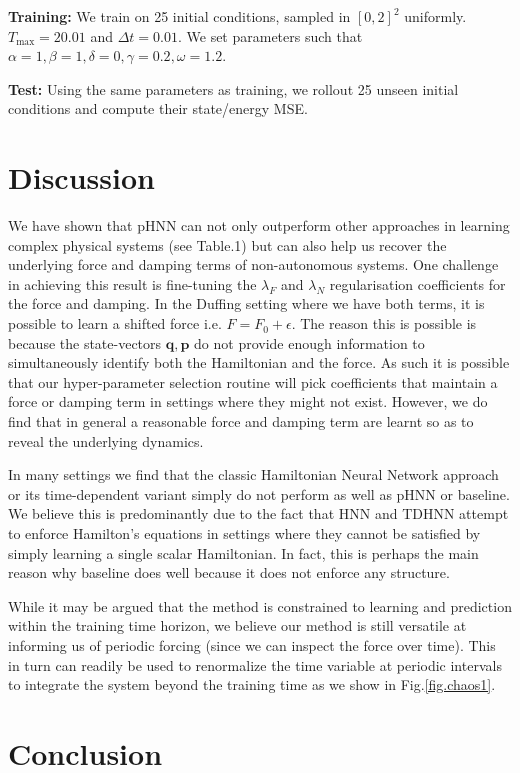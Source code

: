 \documentclass{article}
\begin{document}
\textbf{Training:} We train on 25 initial conditions, sampled in $[0,2]^2$ uniformly. $T_{\max} = 20.01$ and $\Delta t = 0.01$. We set parameters such that $\alpha =1, \beta =1,\delta =0,\gamma = 0.2,\omega = 1.2$.

\textbf{Test:} Using the same parameters as training, we rollout 25 unseen initial conditions and compute their state/energy MSE.

\section{Discussion}

We have shown that pHNN can not only outperform other approaches in learning complex physical systems (see Table.1) but can also help us recover the underlying force and damping terms of non-autonomous systems. One challenge in achieving this result is fine-tuning the $\lambda_F$ and $\lambda_N$ regularisation coefficients for the force and damping. In the Duffing setting where we have both terms, it is possible to learn a shifted force i.e. $F = F_0 + \epsilon$. The reason this is possible is because the state-vectors $\mathbf{q},\mathbf{p}$ do not provide enough information to simultaneously identify both the Hamiltonian and the force. As such it is possible that our hyper-parameter selection routine will pick coefficients that maintain a force or damping term in settings where they might not exist. However, we do find that in general a reasonable force and damping term are learnt so as to reveal the underlying dynamics.

In many settings we find that the classic Hamiltonian Neural Network approach or its time-dependent variant simply do not perform as well as pHNN or baseline. We believe this is predominantly due to the fact that HNN and TDHNN attempt to enforce Hamilton's equations in settings where they cannot be satisfied by simply learning a single scalar Hamiltonian. In fact, this is perhaps the main reason why baseline does well because it does not enforce any structure.

While it may be argued that the method is constrained to learning and prediction within the training time horizon, we believe our method is still versatile at informing us of periodic forcing (since we can inspect the force over time). This in turn can readily be used to renormalize the time variable at periodic intervals to integrate the system beyond the training time as we show in Fig.\ref{fig.chaos1}.

\section{Conclusion}
\end{document}
